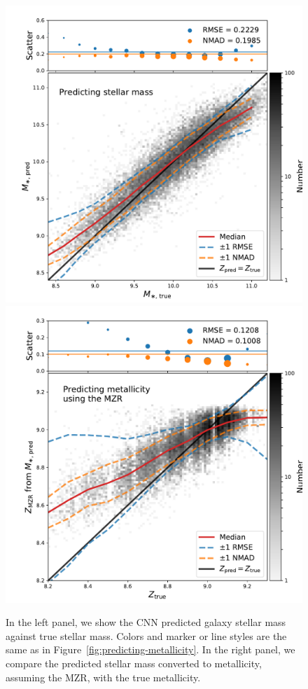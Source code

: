\documentclass[fleqn,usenatbib]{mnras}
\begin{document}
\begin{figure}
	\includegraphics[width=\columnwidth]{05-a-prediction_mass.pdf}
	\includegraphics[width=\columnwidth]{05-b-prediction_mzr.pdf}
	\caption{\label{fig:mass-metallicity}
		In the left panel, we show the CNN predicted galaxy stellar mass against true stellar mass. Colors and marker or line styles are the same as in Figure~\ref{fig:predicting-metallicity}. In the right panel, we compare the predicted stellar mass converted to metallicity, assuming the \cite{Tremonti2004} MZR, with the true metallicity.}
\end{figure}
\end{document}

